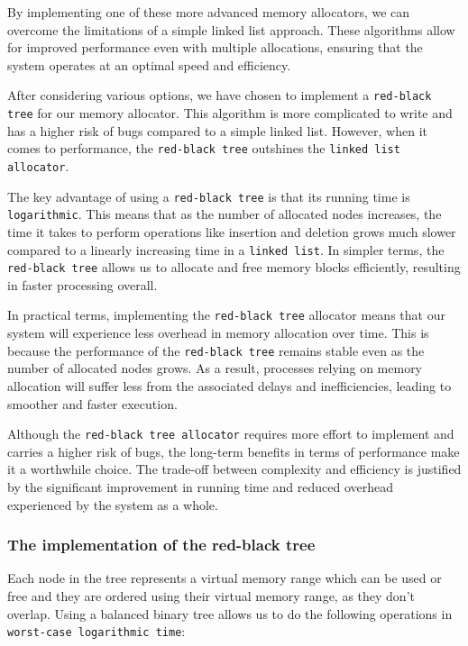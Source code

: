 By implementing one of these more advanced memory allocators, we can overcome the limitations of a simple linked list approach. These algorithms allow for improved performance even with multiple allocations, ensuring that the system operates at an optimal speed and efficiency.

After considering various options, we have chosen to implement a \texttt{red-black tree} for our memory allocator. This algorithm is more complicated to write and has a higher risk of bugs compared to a simple linked list. However, when it comes to performance, the \texttt{red-black tree} outshines the \texttt{linked list allocator}.

The key advantage of using a \texttt{red-black tree} is that its running time is \texttt{logarithmic}. This means that as the number of allocated nodes increases, the time it takes to perform operations like insertion and deletion grows much slower compared to a linearly increasing time in a \texttt{linked list}. In simpler terms, the \texttt{red-black tree} allows us to allocate and free memory blocks efficiently, resulting in faster processing overall.

In practical terms, implementing the \texttt{red-black tree} allocator means that our system will experience less overhead in memory allocation over time. This is because the performance of the \texttt{red-black tree} remains stable even as the number of allocated nodes grows. As a result, processes relying on memory allocation will suffer less from the associated delays and inefficiencies, leading to smoother and faster execution.

Although the \texttt{red-black tree allocator} requires more effort to implement and carries a higher risk of bugs, the long-term benefits in terms of performance make it a worthwhile choice. The trade-off between complexity and efficiency is justified by the significant improvement in running time and reduced overhead experienced by the system as a whole.

\subsubsection{The implementation of the red-black tree}

Each node in the tree represents a virtual memory range which can be used or free and they are ordered using their virtual memory range, as they don't overlap. Using a balanced binary tree allows us to do the following operations in \texttt{worst-case logarithmic time}:

